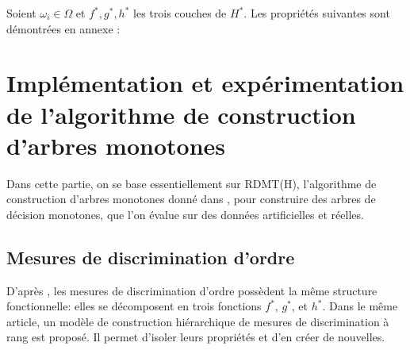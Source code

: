 \documentclass[a4paper]{article}
\begin{document}
Soient $\omega_i \in \Omega$ et $f^*, g^*, h^*$ les trois couches de $H^*$. Les propriétés suivantes sont
démontrées en annexe :


\section{Implémentation et expérimentation de l'algorithme de construction
d'arbres monotones} 
Dans cette partie, on se base essentiellement sur RDMT(H),
l'algorithme de construction d'arbres monotones donné dans \cite{marsala-rank},
pour construire des arbres de décision monotones, que l'on évalue sur des
données artificielles et réelles. 

\subsection{Mesures de discrimination d'ordre} 
D'après
\cite{marsala-rank}, les mesures de discrimination d'ordre possèdent la même
structure fonctionnelle: elles se décomposent en trois fonctions $f^*$, $g^*$,
et $h^*$.  Dans le même
article, un modèle de construction hiérarchique de mesures de discrimination à
rang est proposé. Il permet d'isoler leurs propriétés et d'en créer de
nouvelles. 


\printbibliography
\end{document}
